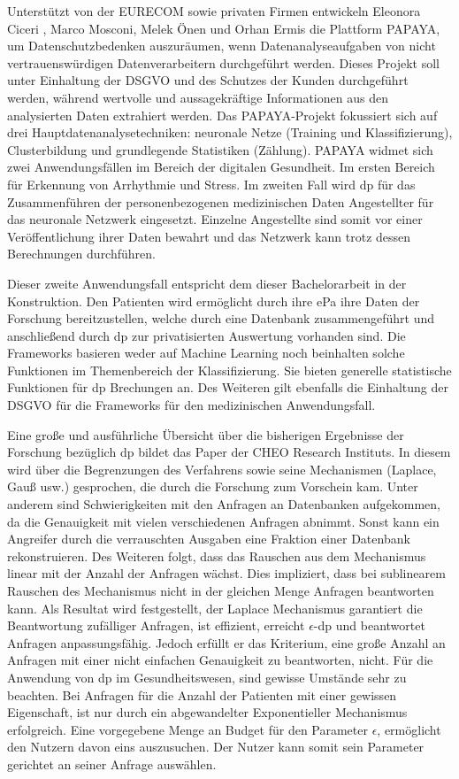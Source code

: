 Unterstützt von der EURECOM sowie privaten Firmen entwickeln Eleonora Ciceri , Marco Mosconi, Melek Önen und Orhan Ermis die Plattform PAPAYA, um Datenschutzbedenken auszuräumen, wenn Datenanalyseaufgaben von nicht vertrauenswürdigen Datenverarbeitern durchgeführt werden. Dieses Projekt soll unter Einhaltung der DSGVO und des Schutzes der Kunden durchgeführt werden, während wertvolle und aussagekräftige Informationen aus den analysierten Daten extrahiert werden. Das PAPAYA-Projekt fokussiert sich auf drei Hauptdatenanalysetechniken: neuronale Netze (Training und Klassifizierung), Clusterbildung und grundlegende Statistiken (Zählung). PAPAYA widmet sich zwei Anwendungsfällen im Bereich der digitalen Gesundheit. Im ersten Bereich für Erkennung von Arrhythmie und Stress. Im zweiten Fall wird \gls{dp} für das Zusammenführen der personenbezogenen medizinischen Daten Angestellter für das neuronale Netzwerk eingesetzt. Einzelne Angestellte sind somit vor einer Veröffentlichung ihrer Daten bewahrt und das Netzwerk kann trotz dessen Berechnungen durchführen.


Dieser zweite Anwendungsfall entspricht dem dieser Bachelorarbeit in der Konstruktion. Den Patienten wird ermöglicht durch ihre \gls{ePa} ihre Daten der Forschung bereitzustellen, welche durch eine Datenbank zusammengeführt und anschließend durch \gls{dp} zur privatisierten Auswertung vorhanden sind. Die Frameworks basieren weder auf Machine Learning noch beinhalten solche Funktionen im Themenbereich der Klassifizierung. Sie bieten generelle statistische Funktionen für \gls{dp} Brechungen an. Des Weiteren gilt ebenfalls die Einhaltung der DSGVO für die Frameworks für den medizinischen Anwendungsfall.


Eine große und ausführliche Übersicht über die bisherigen Ergebnisse der Forschung bezüglich \gls{dp} bildet das Paper \parencite{OverviewDP} der CHEO Research Instituts. In diesem wird über die Begrenzungen des Verfahrens sowie seine Mechanismen (Laplace, Gauß usw.) gesprochen, die durch die Forschung zum Vorschein kam. Unter anderem sind Schwierigkeiten mit den Anfragen an Datenbanken aufgekommen, da die Genauigkeit mit vielen verschiedenen Anfragen abnimmt. Sonst kann ein Angreifer durch die verrauschten Ausgaben eine Fraktion einer Datenbank rekonstruieren. Des Weiteren folgt, dass das Rauschen aus dem Mechanismus linear mit der Anzahl der Anfragen wächst. Dies impliziert, dass bei sublinearem Rauschen des Mechanismus nicht in der gleichen Menge Anfragen beantworten kann. Als Resultat wird festgestellt, der Laplace Mechanismus garantiert die Beantwortung zufälliger Anfragen, ist effizient, erreicht $\epsilon$-\gls{dp} und beantwortet Anfragen anpassungsfähig. Jedoch erfüllt er das Kriterium, eine große Anzahl an Anfragen mit einer nicht einfachen Genauigkeit zu beantworten, nicht. Für die Anwendung von \gls{dp} im Gesundheitswesen, sind gewisse Umstände sehr zu beachten. Bei Anfragen für die Anzahl der Patienten mit einer gewissen Eigenschaft, ist nur durch ein abgewandelter Exponentieller Mechanismus erfolgreich. Eine vorgegebene Menge an Budget für den Parameter $\epsilon$, ermöglicht den Nutzern davon eins auszusuchen. Der Nutzer kann somit sein Parameter gerichtet an seiner Anfrage auswählen.


